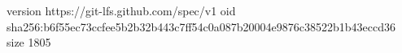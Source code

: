 version https://git-lfs.github.com/spec/v1
oid sha256:b6f55ec73ccfee5b2b32b443c7ff54c0a087b20004e9876c38522b1b43eccd36
size 1805
